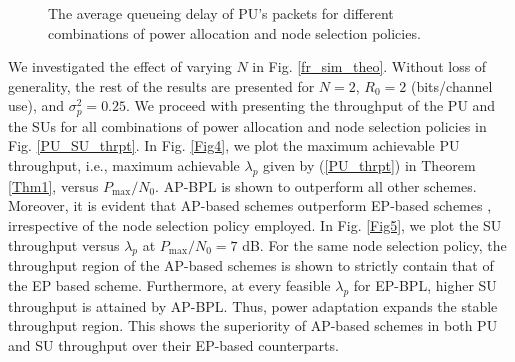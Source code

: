 \documentclass[journal,twocolumn]{IEEEtran}
\begin{document}
\begin{figure*}[t]
 \centering
 \caption{The average queueing delay of PU's packets for different combinations of power allocation and node selection policies.}
 \label{PU_delay}
  \vspace{-3mm}
\end{figure*}

We investigated the effect of varying $N$ in Fig. \ref{fr_sim_theo}. Without loss of generality, the rest of the results are presented for $N=2$, $R_{0}=2$ (bits/channel use), and $\sigma_{p}^{2}=0.25$. We proceed with presenting the throughput of the PU and the SUs for all combinations of power allocation and node selection policies in Fig. \ref{PU_SU_thrpt}. In Fig. \ref{Fig4}, we plot the maximum achievable PU throughput, i.e., maximum achievable $\lambda_{p}$ given by (\ref{PU_thrpt}) in Theorem \ref{Thm1}, versus $P_{\mathrm{max}}/N_{0}$. AP-BPL is shown to outperform all other schemes. Moreover, it is evident that AP-based schemes outperform EP-based schemes \cite{Krikidis}, irrespective of the node selection policy employed. In Fig. \ref{Fig5}, we plot the SU throughput versus $\lambda_{p}$ at $P_{\mathrm{max}}/N_{0}=7$ dB. For the same node selection policy, the throughput region of the AP-based schemes is shown to strictly contain that of the EP based scheme. Furthermore, at every feasible $\lambda_{p}$ for EP-BPL, higher SU throughput is attained by AP-BPL. Thus, power adaptation expands the stable throughput region. This shows the superiority of AP-based schemes in both PU and SU throughput over their EP-based counterparts.
\end{document}
